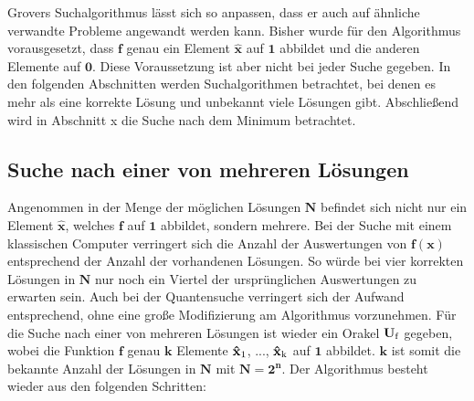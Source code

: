 Grovers Suchalgorithmus lässt sich so anpassen, dass er auch auf ähnliche verwandte Probleme angewandt werden kann.
Bisher wurde für den Algorithmus vorausgesetzt, dass $\mathbf{f}$ genau ein Element $\mathbf{\hat x}$ auf $\mathbf{1}$ abbildet und die anderen Elemente auf $\mathbf{0}$. 
Diese Voraussetzung ist aber nicht bei jeder Suche gegeben. In den folgenden Abschnitten werden Suchalgorithmen betrachtet, bei denen es mehr als eine korrekte Lösung und unbekannt viele Lösungen gibt. 
Abschließend wird in Abschnitt x die Suche nach dem Minimum betrachtet. 

\subsection{Suche nach einer von mehreren Lösungen}

Angenommen in der Menge der möglichen Lösungen $\mathbf{N}$ befindet sich nicht nur ein Element $\mathbf{\hat x}$, welches $\mathbf{f}$ auf $\mathbf{1}$ abbildet, sondern mehrere. 
Bei der Suche mit einem klassischen Computer verringert sich die Anzahl der Auswertungen von $\mathbf{f(x)}$ entsprechend der Anzahl der vorhandenen Lösungen. So würde bei vier korrekten Lösungen in $\mathbf{N}$ nur noch ein Viertel der ursprünglichen Auswertungen zu erwarten sein.
Auch bei der Quantensuche verringert sich der Aufwand entsprechend, ohne eine große Modifizierung am Algorithmus vorzunehmen.
Für die Suche nach einer von mehreren Lösungen ist wieder ein Orakel $\mathbf{U \textsubscript{f}}$ gegeben, wobei die Funktion $\mathbf{f}$ genau $\mathbf{k}$ Elemente $\mathbf{\hat x \textsubscript{1}}$, ..., $\mathbf{\hat x \textsubscript{k}}$ auf $\mathbf{1}$ abbildet. $\mathbf{k}$ ist somit die bekannte Anzahl der Lösungen in $\mathbf{N}$ mit $\mathbf{N = 2^n}$. 
Der Algorithmus besteht wieder aus den folgenden Schritten:
